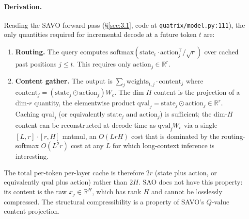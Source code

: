 \paragraph{Derivation.} Reading the SAVO forward pass (\S\ref{sec:3.1}, code at \texttt{quatrix/model.py:111}), the only
quantities required for incremental decode at a future token $t$ are:
\begin{enumerate}
\item \textbf{Routing.} The query computes $\mathrm{softmax}(\mathrm{state}_t \cdot \mathrm{action}_j^\top/\sqrt{r})$ over cached past positions $j \leq t$. This
requires only $\mathrm{action}_j \in \mathbb{R}^r$.
\item \textbf{Content gather.} The output is $\sum_j \mathrm{weights}_{t,j} \cdot \mathrm{content}_j$ where $\mathrm{content}_j = (\mathrm{state}_j \odot \mathrm{action}_j) W_c$.
The dim-$H$ content is the projection of a dim-$r$ quantity, the elementwise product $\mathrm{qval}_j = \mathrm{state}_j \odot
\mathrm{action}_j \in \mathbb{R}^r$. Caching $\mathrm{qval}_j$ (or equivalently $\mathrm{state}_j$ and $\mathrm{action}_j$) is sufficient; the dim-$H$ content
can be reconstructed at decode time as $\mathrm{qval}_j W_c$ via a single $[L, r] \cdot [r, H]$ matmul, an $O(LrH)$ cost
that is dominated by the routing-softmax $O(L^2 r)$ cost at any $L$ for which long-context inference is
interesting.
\end{enumerate}

The total per-token per-layer cache is therefore $2r$ (state plus action, or equivalently qval plus action)
rather than $2H$. SAO does not have this property: its content is the raw $x_j \in \mathbb{R}^H$, which has rank $H$
and cannot be losslessly compressed. The structural compressibility is a property of SAVO's $Q$-value
content projection.


